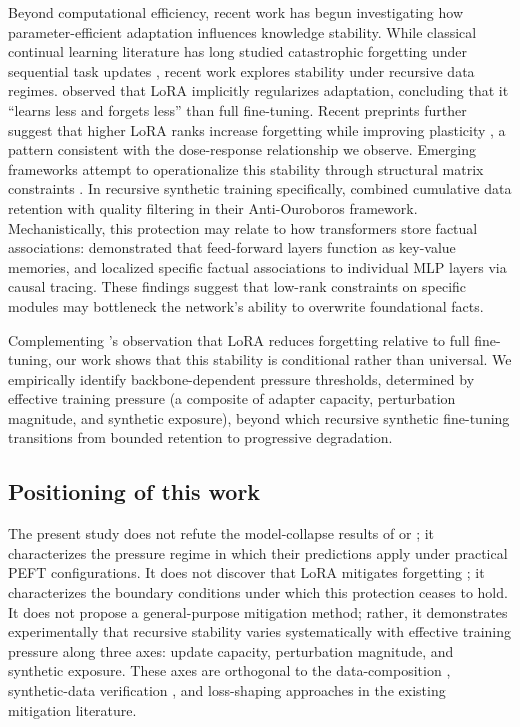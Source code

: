\documentclass[a4paper,fleqn]{cas-dc}
\begin{document}
Beyond computational efficiency, recent work has begun investigating how
parameter-efficient adaptation influences knowledge stability. While classical
continual learning literature has long studied catastrophic forgetting under
sequential task updates \citep{kirkpatrick2017,delange2022,shi2024continualllm}, recent work
explores stability under recursive data regimes. \citet{biderman2024} observed
that LoRA implicitly regularizes adaptation, concluding that it ``learns less
and forgets less'' than full fine-tuning. Recent preprints further suggest that
higher LoRA ranks increase forgetting while improving plasticity
\citep{biderman2024incremental,ding2024ranktrade},
a pattern consistent with the dose-response relationship we observe. Emerging
frameworks attempt to operationalize this stability through structural matrix
constraints \citep{fawi2024curlora}. In
recursive synthetic training specifically, \citet{adapala2025} combined
cumulative data retention with quality filtering in their Anti-Ouroboros
framework. Mechanistically, this protection may relate to how transformers
store factual associations: \citet{geva2021} demonstrated that feed-forward
layers function as key-value memories, and \citet{meng2022locating} localized
specific factual associations to individual MLP layers via causal tracing. These
findings suggest that low-rank constraints on specific modules may bottleneck
the network's ability to overwrite foundational facts.

Complementing \citet{biderman2024}'s observation that LoRA reduces forgetting
relative to full fine-tuning, our work shows that this stability is conditional
rather than universal. We empirically identify backbone-dependent pressure
thresholds, determined by effective training pressure (a composite of adapter
capacity, perturbation magnitude, and synthetic exposure), beyond which
recursive synthetic fine-tuning transitions from bounded retention to
progressive degradation.

\subsection{Positioning of this work}

The present study does not refute the model-collapse results of
\citet{shumailov2024} or \citet{dohmatob2025}; it characterizes the pressure
regime in which their predictions apply under practical PEFT configurations. It
does not discover that LoRA mitigates forgetting \citep{biderman2024}; it
characterizes the boundary conditions under which this protection ceases to
hold. It does not propose a general-purpose mitigation method; rather, it
demonstrates experimentally that recursive stability varies systematically with
effective training pressure along three axes: update capacity, perturbation
magnitude, and synthetic exposure. These axes are orthogonal to the
data-composition \citep{gerstgrasser2024}, synthetic-data verification
\citep{yi2025}, and loss-shaping \citep{zibakhsh2024} approaches in the
existing mitigation literature.
\end{document}
